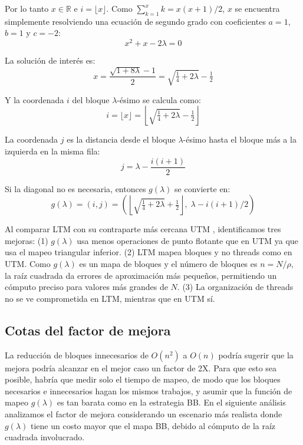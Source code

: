 \documentclass[twocolumn,10pt,a4paper]{article}
\begin{document}
Por lo tanto $x \in \mathbb{R}$ e $i = \lfloor x \rfloor$. Como
$\sum_{k=1}^{x} k = x(x+1)/2$, $x$ se encuentra simplemente resolviendo una
ecuación de segundo grado con coeficientes $a = 1$, $b = 1$ y $c = -2$:
\begin{equation}
x^2 + x - 2\lambda = 0
\label{eq:quadratic}
\end{equation}

La solución de interés es:
\begin{equation}
x = \frac{\sqrt{1 + 8\lambda} - 1}{2} = \sqrt{\tfrac{1}{4} + 2\lambda} - \tfrac{1}{2}
\label{eq:x_solution}
\end{equation}

Y la coordenada $i$ del bloque $\lambda$-ésimo se calcula como:
\begin{equation}
i = \lfloor x \rfloor = \left\lfloor \sqrt{\tfrac{1}{4} + 2\lambda} - \tfrac{1}{2} \right\rfloor
\label{eq:i_coord}
\end{equation}

La coordenada $j$ es la distancia desde el bloque $\lambda$-ésimo hasta el
bloque más a la izquierda en la misma fila:
\begin{equation}
j = \lambda - \frac{i(i+1)}{2}
\label{eq:j_coord}
\end{equation}

Si la diagonal no es necesaria, entonces $g(\lambda)$ se convierte en:
\begin{equation}
g(\lambda) = (i, j) = \left(
  \left\lfloor \sqrt{\tfrac{1}{4} + 2\lambda} + \tfrac{1}{2} \right\rfloor,
  \; \lambda - i(i+1)/2
\right)
\label{eq:g_no_diag}
\end{equation}

Al comparar LTM con su contraparte más cercana UTM \cite{ref1}, identificamos
tres mejoras: (1) $g(\lambda)$ usa menos operaciones de punto flotante que en
UTM ya que usa el mapeo triangular inferior. (2) LTM mapea bloques y no threads
como en UTM. Como $g(\lambda)$ es un mapa de bloques y el número de bloques
es $n = N/\rho$, la raíz cuadrada da errores de aproximación más pequeños,
permitiendo un cómputo preciso para valores más grandes de $N$. (3) La
organización de threads no se ve comprometida en LTM, mientras que en UTM sí.

\subsection{Cotas del factor de mejora}

La reducción de bloques innecesarios de $O(n^2)$ a $O(n)$ podría sugerir que
la mejora podría alcanzar en el mejor caso un factor de 2X. Para que esto sea
posible, habría que medir solo el tiempo de mapeo, de modo que los bloques
necesarios e innecesarios hagan los mismos trabajos, y asumir que la función
de mapeo $g(\lambda)$ es tan barata como en la estrategia BB. En el siguiente
análisis analizamos el factor de mejora considerando un escenario más realista
donde $g(\lambda)$ tiene un costo mayor que el mapa BB, debido al cómputo de
la raíz cuadrada involucrado.
\end{document}
